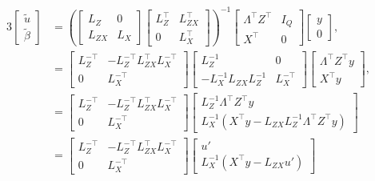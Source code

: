 \documentclass[article,shortnames]{jss}
\begin{document}
\begin{alignat*}{3}
  \begin{bmatrix} \tilde{u} \\ \tilde{\beta} \end{bmatrix} & =
  \left(\begin{bmatrix} L_Z & 0 \\ L_{ZX} & L_X \end{bmatrix}
    \begin{bmatrix} L_Z^\top & L_{ZX}^\top \\ 0 & L_X^\top \end{bmatrix}\right)^{-1}
  \begin{bmatrix}\Lambda^\top Z^\top & I_Q \\ X^\top &
    0 \end{bmatrix} \begin{bmatrix}y \\ 0 \end{bmatrix}, \\
  & = \begin{bmatrix} L_Z^{-\top} & -L_Z^{-\top}L_{ZX}^\top
    L_X^{-\top} \\ 0 & L_X^{-\top} \end{bmatrix}
  \begin{bmatrix} L_Z^{-1} & 0 \\
    -L_X^{-1}L_{ZX}L_Z^{-1} & L_X^{-\top} \end{bmatrix}
  \begin{bmatrix} \Lambda^\top Z^\top y \\ X^\top y \end{bmatrix}, \\
  & = \begin{bmatrix} L_Z^{-\top} & -L_Z^{-\top}L_{ZX}^\top
    L_X^{-\top} \\ 0 & L_X^{-\top} \end{bmatrix}
  \begin{bmatrix}
    L_Z^{-1} \Lambda^\top Z^\top y \\
    L_X^{-1}\left(X^\top y - L_{ZX}L_Z^{-1}\Lambda^\top Z^\top y\right)
  \end{bmatrix} \\
  & = \begin{bmatrix} L_Z^{-\top} & -L_Z^{-\top}L_{ZX}^\top
    L_X^{-\top} \\ 0 & L_X^{-\top} \end{bmatrix}
  \begin{bmatrix}
    u' \\ L_X^{-1} \left(X^\top y - L_{ZX}u'\right) \end{bmatrix}

\end{alignat*}
\end{document}
